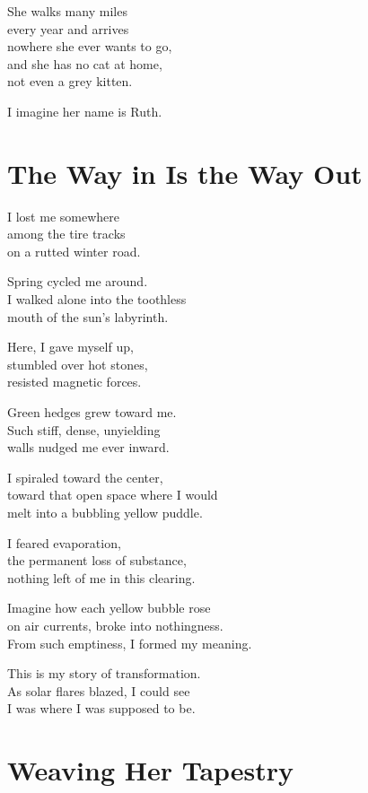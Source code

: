 \documentclass[twoside,10pt]{book}
\begin{document}
She walks many miles\\
every year and arrives\\
nowhere she ever wants to go,\\
and she has no cat at home,\\
not even a grey kitten.

I imagine her name is Ruth.


\clearpage
\section{The Way in Is the Way Out}

I lost me somewhere\\
among the tire tracks\\
on a rutted winter road.

Spring cycled me around.\\
I walked alone into the toothless\\
mouth of the sun's labyrinth.

Here, I gave myself up,\\
stumbled over hot stones,\\
resisted magnetic forces.

Green hedges grew toward me.\\
Such stiff, dense, unyielding\\
walls nudged me ever inward.

I spiraled toward the center,\\
toward that open space where I would\\
melt into a bubbling yellow puddle.

I feared evaporation,\\
the permanent loss of substance,\\
nothing left of me in this clearing.

Imagine how each yellow bubble rose\\
on air currents, broke into nothingness.\\
From such emptiness, I formed my meaning.

This is my story of transformation.\\
As solar flares blazed, I could see\\
I was where I was supposed to be.


\clearpage
\section{Weaving Her Tapestry}
\end{document}
